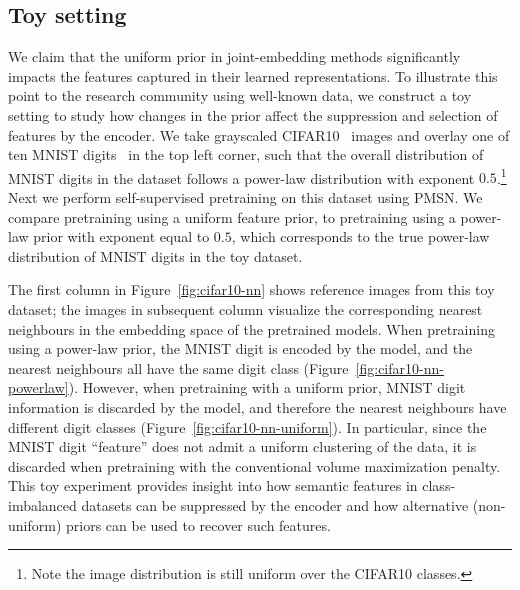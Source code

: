 \documentclass{article} %
\begin{document}
\subsection{Toy setting}

We claim that the uniform prior in joint-embedding methods significantly impacts the features captured in their learned representations.
To illustrate this point to the research community using well-known data,  we construct a toy setting to study how changes in the prior affect the suppression and selection of features by the encoder. 
We take grayscaled CIFAR10~\citep{krizhevsky2009learning} images and overlay one of ten MNIST digits~\citep{lecun-mnisthandwrittendigit-2010} in the top left corner, such that the overall distribution of MNIST digits in the dataset follows a power-law distribution with exponent $0.5$.\footnote{Note the image distribution is still uniform over the CIFAR10 classes.}
Next we perform self-supervised pretraining on this dataset using PMSN.
We compare pretraining using a uniform feature prior, to pretraining using a power-law prior with exponent equal to $0.5$, which corresponds to the true power-law distribution of MNIST digits in the toy dataset.

The first column in Figure~\ref{fig:cifar10-nn} shows reference images from this toy dataset; the images in subsequent column visualize the corresponding nearest neighbours in the embedding space of the pretrained models.
When pretraining using a power-law prior, the MNIST digit is encoded by the model, and the nearest neighbours all have the same digit class (Figure~\ref{fig:cifar10-nn-powerlaw}).
However, when pretraining with a uniform prior, MNIST digit information is discarded by the model, and therefore the nearest neighbours have different digit classes (Figure~\ref{fig:cifar10-nn-uniform}).
In particular, since the MNIST digit ``feature'' does not admit a uniform clustering of the data, it is discarded when pretraining with the conventional volume maximization penalty.
This toy experiment provides insight into how semantic features in class-imbalanced datasets can be suppressed by the encoder and how alternative (non-uniform) priors can be used to recover such features.
\end{document}
